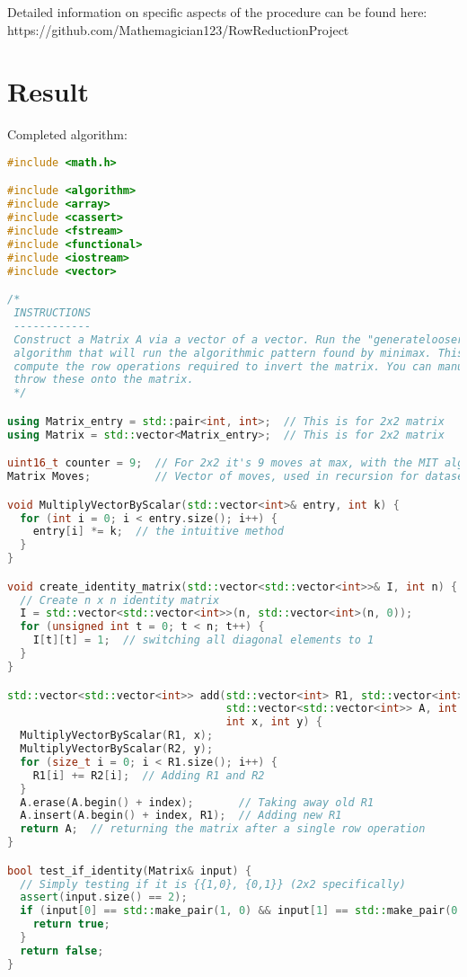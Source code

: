 \documentclass{article}
\begin{document}
Detailed information on specific aspects of the procedure can be found here: \\ 
https://github.com/Mathemagician123/RowReductionProject
\section*{Result}
Completed algorithm:
\begin{lstlisting}[language=C++]
#include <math.h>

#include <algorithm>
#include <array>
#include <cassert>
#include <fstream>
#include <functional>
#include <iostream>
#include <vector>

/*
 INSTRUCTIONS
 ------------
 Construct a Matrix A via a vector of a vector. Run the "generatelooserdataset"
 algorithm that will run the algorithmic pattern found by minimax. This will
 compute the row operations required to invert the matrix. You can manually
 throw these onto the matrix.
 */

using Matrix_entry = std::pair<int, int>;  // This is for 2x2 matrix
using Matrix = std::vector<Matrix_entry>;  // This is for 2x2 matrix

uint16_t counter = 9;  // For 2x2 it's 9 moves at max, with the MIT algorithm
Matrix Moves;          // Vector of moves, used in recursion for dataset

void MultiplyVectorByScalar(std::vector<int>& entry, int k) {
  for (int i = 0; i < entry.size(); i++) {
    entry[i] *= k;  // the intuitive method
  }
}

void create_identity_matrix(std::vector<std::vector<int>>& I, int n) {
  // Create n x n identity matrix
  I = std::vector<std::vector<int>>(n, std::vector<int>(n, 0));
  for (unsigned int t = 0; t < n; t++) {
    I[t][t] = 1;  // switching all diagonal elements to 1
  }
}

std::vector<std::vector<int>> add(std::vector<int> R1, std::vector<int> R2,
                                  std::vector<std::vector<int>> A, int index,
                                  int x, int y) {
  MultiplyVectorByScalar(R1, x);
  MultiplyVectorByScalar(R2, y);
  for (size_t i = 0; i < R1.size(); i++) {
    R1[i] += R2[i];  // Adding R1 and R2
  }
  A.erase(A.begin() + index);       // Taking away old R1
  A.insert(A.begin() + index, R1);  // Adding new R1
  return A;  // returning the matrix after a single row operation
}

bool test_if_identity(Matrix& input) {
  // Simply testing if it is {{1,0}, {0,1}} (2x2 specifically)
  assert(input.size() == 2);
  if (input[0] == std::make_pair(1, 0) && input[1] == std::make_pair(0, 1)) {
    return true;
  }
  return false;
}


\end{lstlisting}
\end{document}
